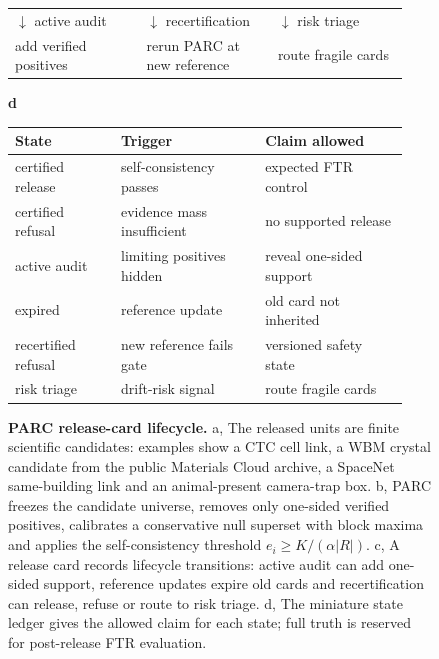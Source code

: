 \documentclass[10pt,twocolumn]{article}
\begin{document}
\begin{figure}[t]
\begin{minipage}[t]{0.47\linewidth}
{    \vspace{2pt}
    \begin{tabular}{@{}P{0.31\linewidth}P{0.31\linewidth}P{0.31\linewidth}@{}}
      \(\downarrow\) active audit & \(\downarrow\) recertification & \(\downarrow\) risk triage \\
      add verified positives & rerun PARC at new reference & route fragile cards \\
    \end{tabular}}
  \end{minipage}\hfill
  \begin{minipage}[t]{0.50\linewidth}
    \textbf{d}\par\vspace{0.25em}
    {\scriptsize
    \setlength{\tabcolsep}{2pt}
    \renewcommand{\arraystretch}{1.05}
    \begin{tabular}{@{}P{0.25\linewidth}P{0.34\linewidth}P{0.34\linewidth}@{}}
      \toprule
      State & Trigger & Claim allowed \\
      \midrule
      certified release & self-consistency passes & expected FTR control \\
      certified refusal & evidence mass insufficient & no supported release \\
      active audit & limiting positives hidden & reveal one-sided support \\
      expired & reference update & old card not inherited \\
      recertified refusal & new reference fails gate & versioned safety state \\
      risk triage & drift-risk signal & route fragile cards \\
      \bottomrule
    \end{tabular}}
  \end{minipage}
  \caption{\textbf{PARC release-card lifecycle.} a, The released units are finite scientific candidates: examples show a CTC cell link, a WBM crystal candidate from the public Materials Cloud archive, a SpaceNet same-building link and an animal-present camera-trap box. b, PARC freezes the candidate universe, removes only one-sided verified positives, calibrates a conservative null superset with block maxima and applies the self-consistency threshold \(e_i\ge K/(\alpha |R|)\). c, A release card records lifecycle transitions: active audit can add one-sided support, reference updates expire old cards and recertification can release, refuse or route to risk triage. d, The miniature state ledger gives the allowed claim for each state; full truth is reserved for post-release FTR evaluation.}
  \label{fig:overview}
\end{figure}
\end{document}
